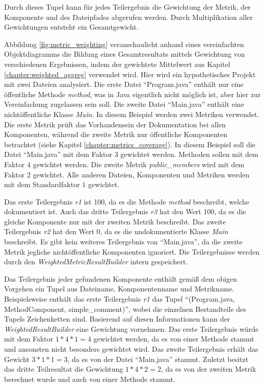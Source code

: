 
Durch dieses Tupel kann für jedes Teilergebnis die Gewichtung der Metrik, der Komponente und des Dateipfades  abgerufen werden. Durch Multiplikation  aller Gewichtungen entsteht ein Gesamtgewicht.

Abbildung \ref{fig:metric_weighting} veranschaulicht anhand eines vereinfachten Objektdiagramms die Bildung eines Gesamtresultats mittels Gewichtung von verschiedenen Ergebnissen, indem der gewichtete Mittelwert aus Kapitel \ref{chapter:weighted_aggreg} verwendet wird. Hier wird ein hypothetisches Projekt mit zwei Dateien analysiert. Die erste Datei \enquote{Program.java} enthält nur eine öffentliche Methode \textit{method}, was in Java eigentlich nicht möglich ist, aber hier zur Vereinfachung zugelassen sein soll. Die zweite Datei \enquote{Main.java} enthält eine nichtöffentliche Klasse \textit{Main}. In diesem Beispiel werden zwei Metriken verwendet. Die erste Metrik prüft das Vorhandensein der Dokumentation bei allen Komponenten, während die zweite Metrik nur öffentliche Komponenten betrachtet (siehe Kapitel \ref{chapter:metrics_coverage}). In diesem Beispiel soll die Datei \enquote{Main.java} mit dem Faktor $3$ gewichtet werden. Methoden sollen mit dem Faktor $4$ gewichtet werden. Die zweite Metrik \textit{public\_members} wird mit dem Faktor $2$ gewichtet. Alle anderen Dateien, Komponenten und Metriken werden mit dem Standardfaktor $1$ gewichtet.

Das erste Teilergebnis \textit{r1} ist 100, da es die  Methode \textit{method} beschreibt, welche dokumentiert ist. Auch das dritte Teilergebnis \textit{r3} hat den Wert 100, da es die gleiche Komponente nur mit der zweiten Metrik beschreibt. Das zweite Teilergebnis \textit{r2} hat den Wert 0, da es die undokumentierte Klasse \textit{Main} beschreibt.  Es gibt kein weiteres Teilergebnis von \enquote{Main.java}, da die zweite Metrik jegliche nichtöffentliche Komponenten ignoriert. Die Teilergebnisse werden durch den \textit{WeightedMetricResultBuilder} intern gespeichert. 

Das Teilergebnis jeder gefundenen Komponente enthält gemäß dem obigen Vorgehen ein Tupel aus Dateiname, Komponentenname und Metrikname. Beispielsweise enthält das erste  Teilergebnis \textit{r1} das Tupel \enquote{(Program.java, MethodComponent, simple\_comment)}, wobei die einzelnen Bestandteile des Tupels Zeichenketten sind. Basierend auf diesen Informationen kann der \textit{WeightedResultBuilder} eine Gewichtung vornehmen. Das erste Teilergebnis würde mit dem Faktor $1*4*1=4$ gewichtet werden, da es von einer Methode stammt  und ansonsten nicht besonders gewichtet wird. Das zweite Teilergebnis erhält das Gewicht $3*1*1=3$, da es von der Datei \enquote{Main.java} stammt. Zuletzt besitzt das dritte Teilresultat die Gewichtung $1*4*2=2$, da es von der zweiten Metrik berechnet wurde und auch von einer Methode stammt. 

